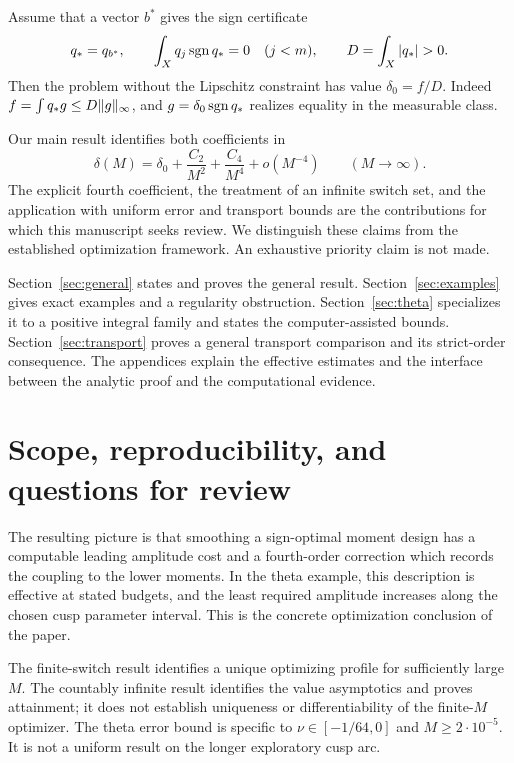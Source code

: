 Assume that a vector \(b^*\) gives the sign certificate
\begin{equation}\label{eq:signcertificate}
 q_*=q_{b^*},\qquad
 \int_Xq_j\sgn q_*=0\quad(j<m),\qquad D=\int_X|q_*|>0 .
\end{equation}
Then the problem without the Lipschitz constraint has value
\(\delta_0=f/D\). Indeed \(f=\int q_*g\leq D\lVert g\rVert_\infty\),
and \(g=\delta_0\operatorname{sgn} q_*\) realizes equality in the measurable class.

Our main result identifies both coefficients in
\[
 \delta(M)=\delta_0+\frac{C_2}{M^2}+\frac{C_4}{M^4}+o(M^{-4})
 \qquad(M\longrightarrow\infty).
\]
The explicit fourth coefficient, the treatment of an infinite switch set, and
the application with uniform error and transport bounds are the contributions
for which this manuscript seeks review. We distinguish these claims from the
established optimization framework. An exhaustive priority claim is not made.

Section~\ref{sec:general} states and proves the general result.
Section~\ref{sec:examples} gives exact examples and a regularity obstruction.
Section~\ref{sec:theta} specializes it to a positive integral family and states
the computer-assisted bounds. Section~\ref{sec:transport} proves a general
transport comparison and its strict-order consequence. The appendices explain
the effective estimates and the interface between the analytic proof and the
computational evidence.






\section{Scope, reproducibility, and questions for review}\label{sec:scope}
The resulting picture is that smoothing a sign-optimal moment design has
a computable leading amplitude cost and a fourth-order correction which
records the coupling to the lower moments. In the theta example, this
description is effective at stated budgets, and the least required amplitude
increases along the chosen cusp parameter interval. This is the concrete
optimization conclusion of the paper.

The finite-switch result identifies a unique optimizing profile for sufficiently
large \(M\). The countably infinite result identifies the value asymptotics and
proves attainment; it does not establish uniqueness or differentiability of the
finite-\(M\) optimizer. The theta error bound is specific to
\(\nu\in[-1/64,0]\) and \(M\geq2\cdot10^{-5}\). It is not a uniform result
on the longer exploratory cusp arc.

